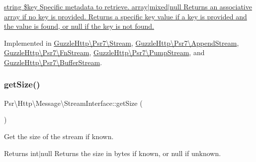 \hyperlink{}{string \$key Specific metadata to retrieve.  array$\vert$mixed$\vert$null Returns an associative array if no key is provided. Returns a specific key value if a key is provided and the value is found, or null if the key is not found. }

Implemented in \hyperlink{classGuzzleHttp_1_1Psr7_1_1Stream_a35f44d3d2b973f128c493f7359c42dbb}{Guzzle\+Http\textbackslash{}\+Psr7\textbackslash{}\+Stream}, \hyperlink{classGuzzleHttp_1_1Psr7_1_1AppendStream_afc64ba83a220f390693d76ccf5aca203}{Guzzle\+Http\textbackslash{}\+Psr7\textbackslash{}\+Append\+Stream}, \hyperlink{classGuzzleHttp_1_1Psr7_1_1FnStream_a9c89106787767a9c5d48ea71c72ace45}{Guzzle\+Http\textbackslash{}\+Psr7\textbackslash{}\+Fn\+Stream}, \hyperlink{classGuzzleHttp_1_1Psr7_1_1PumpStream_a2b6f8daa65b2bc0a78f4950dfcb97d48}{Guzzle\+Http\textbackslash{}\+Psr7\textbackslash{}\+Pump\+Stream}, and \hyperlink{classGuzzleHttp_1_1Psr7_1_1BufferStream_aa7a661e5c0549b50afc537a3d33db728}{Guzzle\+Http\textbackslash{}\+Psr7\textbackslash{}\+Buffer\+Stream}.

\mbox{\label{interfacePsr_1_1Http_1_1Message_1_1StreamInterface_a85b9ff28e3ee39d95a47e623d866cf76}} 
\subsubsection{\texorpdfstring{get\+Size()}{getSize()}}
{\footnotesize\ttfamily Psr\textbackslash{}\+Http\textbackslash{}\+Message\textbackslash{}\+Stream\+Interface\+::get\+Size (\begin{DoxyParamCaption}{ }\end{DoxyParamCaption})}

Get the size of the stream if known.

\begin{DoxyReturn}{Returns}
int$\vert$null Returns the size in bytes if known, or null if unknown. 
\end{DoxyReturn}



